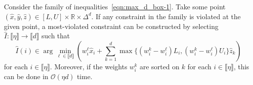 \documentclass[smallextended]{svjour3}
\newcommand{\bbR}{\mathbb{R}}
\begin{document}
\begin{proposition} \label{prop:max_sharp_sep}
Consider the family of inequalities~\eqref{eqn:max_d_box-1}. Take some point $(\hat{x},\hat{y},\hat{z}) \in [L,U] \times \bbR \times \Delta^d$. If any constraint in the family is violated at the given point, a most-violated constraint can be constructed by selecting $\hat{I} : \llbracket \eta \rrbracket \to \llbracket d \rrbracket$ such that
\begin{equation}
        \hat{I}(i) \in \arg\min_{\ell\in\llbracket d\rrbracket} \left( w^{\ell}_i\hat{x}_i+\sum_{k=1}^d\max\{(w^{k}_i-w^{\ell}_i)L_i,(w^{k}_i-w^{\ell}_i)U_i\}\hat{z}_k \right) \label{eqn:max_box_d_separate}
\end{equation}
for each $i \in \llbracket \eta \rrbracket$. Moreover, if the weights $w_i^k$ are sorted on $k$ for each $i \in \llbracket \eta \rrbracket$, this can be done in $\mathcal{O}(\eta d)$ time.
\end{proposition}
\end{document}
